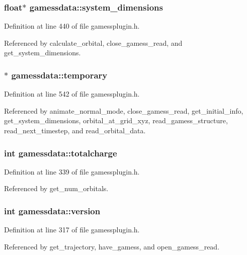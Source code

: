 \subsubsection{\setlength{\rightskip}{0pt plus 5cm}float$\ast$ gamessdata::system\_\-dimensions}\label{structgamessdata_m55}




Definition at line 440 of file gamessplugin.h.

Referenced by calculate\_\-orbital, close\_\-gamess\_\-read, and get\_\-system\_\-dimensions.
\subsubsection{$\ast$ gamessdata::temporary}\label{structgamessdata_m75}




Definition at line 542 of file gamessplugin.h.

Referenced by animate\_\-normal\_\-mode, close\_\-gamess\_\-read, get\_\-initial\_\-info, get\_\-system\_\-dimensions, orbital\_\-at\_\-grid\_\-xyz, read\_\-gamess\_\-structure, read\_\-next\_\-timestep, and read\_\-orbital\_\-data.
\subsubsection{\setlength{\rightskip}{0pt plus 5cm}int gamessdata::totalcharge}\label{structgamessdata_m21}




Definition at line 339 of file gamessplugin.h.

Referenced by get\_\-num\_\-orbitals.
\subsubsection{\setlength{\rightskip}{0pt plus 5cm}int gamessdata::version}\label{structgamessdata_m16}




Definition at line 317 of file gamessplugin.h.

Referenced by get\_\-trajectory, have\_\-gamess, and open\_\-gamess\_\-read.
